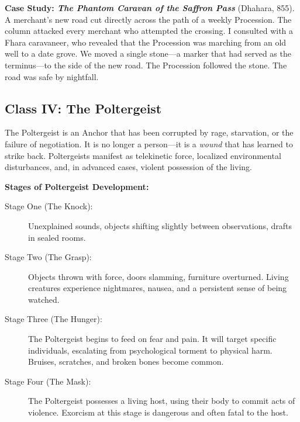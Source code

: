 \textbf{Case Study: \emph{The Phantom Caravan of the Saffron Pass}} (Dhahara, 855). A merchant's new road cut directly across the path of a weekly Procession. The column attacked every merchant who attempted the crossing. I consulted with a Fhara caravaneer, who revealed that the Procession was marching from an old well to a date grove. We moved a single stone---a marker that had served as the terminus---to the side of the new road. The Procession followed the stone. The road was safe by nightfall.

\subsection{Class IV: The Poltergeist}

The Poltergeist is an Anchor that has been corrupted by rage, starvation, or the failure of negotiation. It is no longer a person---it is a \emph{wound} that has learned to strike back. Poltergeists manifest as telekinetic force, localized environmental disturbances, and, in advanced cases, violent possession of the living.

\textbf{Stages of Poltergeist Development:}
\begin{description}
  \item[Stage One (The Knock):] Unexplained sounds, objects shifting slightly between observations, drafts in sealed rooms.
  \item[Stage Two (The Grasp):] Objects thrown with force, doors slamming, furniture overturned. Living creatures experience nightmares, nausea, and a persistent sense of being watched.
  \item[Stage Three (The Hunger):] The Poltergeist begins to feed on fear and pain. It will target specific individuals, escalating from psychological torment to physical harm. Bruises, scratches, and broken bones become common.
  \item[Stage Four (The Mask):] The Poltergeist possesses a living host, using their body to commit acts of violence. Exorcism at this stage is dangerous and often fatal to the host.
\end{description}

